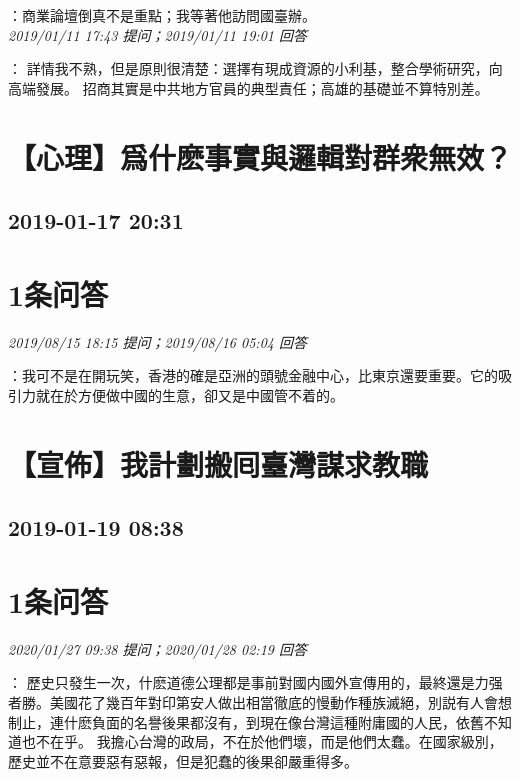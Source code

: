 \documentclass[twocolumn]{ctexart}
\begin{document}
：商業論壇倒真不是重點；我等著他訪問國臺辦。
\\

\textit{\hfill\noindent\small 2019/01/11 17:43 提问；2019/01/11 19:01 回答}

：
詳情我不熟，但是原則很清楚：選擇有現成資源的小利基，整合學術研究，向高端發展。
招商其實是中共地方官員的典型責任；高雄的基礎並不算特別差。
\\


\section{【心理】爲什麽事實與邏輯對群衆無效？}
\subsection{2019-01-17 20:31}


\section{1条问答}

\textit{\hfill\noindent\small 2019/08/15 18:15 提问；2019/08/16 05:04 回答}

：我可不是在開玩笑，香港的確是亞洲的頭號金融中心，比東京還要重要。它的吸引力就在於方便做中國的生意，卻又是中國管不着的。
\\


\section{【宣佈】我計劃搬囘臺灣謀求教職}
\subsection{2019-01-19 08:38}


\section{1条问答}

\textit{\hfill\noindent\small 2020/01/27 09:38 提问；2020/01/28 02:19 回答}

：
歷史只發生一次，什麽道德公理都是事前對國内國外宣傳用的，最終還是力强者勝。美國花了幾百年對印第安人做出相當徹底的慢動作種族滅絕，別説有人會想制止，連什麽負面的名譽後果都沒有，到現在像台灣這種附庸國的人民，依舊不知道也不在乎。 
我擔心台灣的政局，不在於他們壞，而是他們太蠢。在國家級別，歷史並不在意要惡有惡報，但是犯蠢的後果卻嚴重得多。
\\
\end{document}
